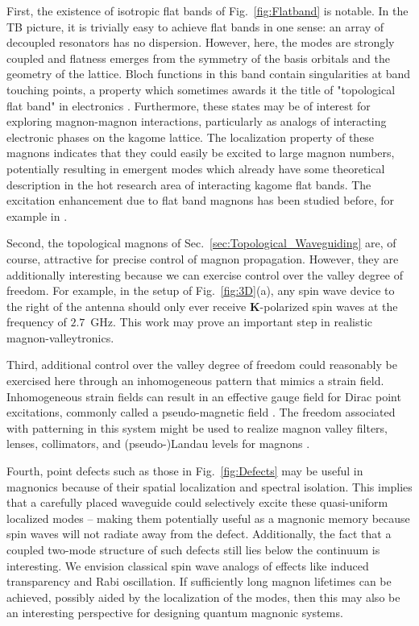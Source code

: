 \documentclass[aps,prx,twocolumn,superscriptaddress,floatfix]{revtex4-2}
\begin{document}
First, the existence of isotropic flat bands of Fig.~\ref{fig:Flatband}  is notable. In the TB picture, it is trivially easy to achieve flat bands in one sense: an array of decoupled resonators has no dispersion. However, here, the modes are strongly coupled and flatness emerges from the symmetry of the basis orbitals and the geometry of the lattice. Bloch functions in this band contain singularities at band touching points, a property which sometimes awards it the title of "topological flat band" in electronics \cite{liu_orbital_2022, rhim_singular_2021}. Furthermore, these states may be of interest for exploring magnon-magnon interactions, particularly as analogs of interacting electronic phases on the kagome lattice. The localization property of these magnons indicates that they could easily be excited to large magnon numbers, potentially resulting in emergent modes which already have some theoretical description in the hot research area of interacting kagome flat bands. The excitation enhancement due to flat band magnons has been studied before, for example in \cite{wang_broad-wave-vector_2024}.

Second, the topological magnons of Sec.~\ref{sec:Topological_Waveguiding} are, of course, attractive for precise control of magnon propagation. However, they are additionally interesting because we can exercise control over the valley degree of freedom. For example, in the setup of Fig.~\ref{fig:3D}(a), any spin wave device to the right of the antenna should only ever receive $\mathbf{K}$-polarized spin waves at the frequency of $2.7$~GHz. This work may prove an important step in realistic magnon-valleytronics. 

Third, additional control over the valley degree of freedom could reasonably be exercised here through an inhomogeneous pattern that mimics a strain field. Inhomogeneous strain fields can result in an effective gauge field for Dirac point excitations, commonly called a pseudo-magnetic field \cite{pereira_strain_2009, kang_pseudo-magnetic_2021}. The freedom associated with patterning in this system might be used to realize magnon valley filters, lenses, collimators, and (pseudo-)Landau levels for magnons \cite{sun_magnon_2021, wei_strain-engineered_2024, jamadi_direct_2020}.

Fourth, point defects such as those in Fig.~\ref{fig:Defects} may be useful in magnonics because of their spatial localization and spectral isolation. This implies that a carefully placed waveguide could selectively excite these quasi-uniform localized modes -- making them potentially useful as a magnonic memory because spin waves will not radiate away from the defect. Additionally, the fact that a coupled two-mode structure of such defects still lies below the continuum is interesting. We envision classical spin wave analogs of effects like induced transparency and Rabi oscillation. If sufficiently long magnon lifetimes can be achieved, possibly aided by the localization of the modes\cite{serha_ultra-long-living_2025}, then this may also be an interesting perspective for designing quantum magnonic systems.
\end{document}

